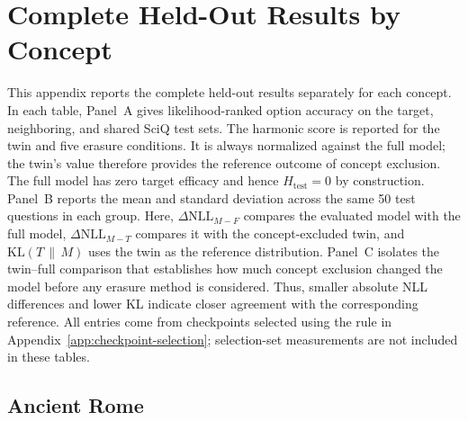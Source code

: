 \clearpage
\onecolumn
\section{Complete Held-Out Results by Concept}
\label{app:full-results}

This appendix reports the complete held-out results separately for each
concept. In each table, Panel~A gives likelihood-ranked option accuracy on the
target, neighboring, and shared SciQ test sets. The harmonic score is reported
for the twin and five erasure conditions. It is always normalized against the
full model; the twin's value therefore provides the reference outcome of
concept exclusion. The full model has zero target efficacy and hence
$H_{\mathrm{test}}=0$ by construction. Panel~B reports the mean and standard deviation
across the same 50 test questions in each group. Here,
$\Delta\mathrm{NLL}_{M-F}$ compares the evaluated model with the full model,
$\Delta\mathrm{NLL}_{M-T}$ compares it with the concept-excluded twin, and
$\mathrm{KL}(T\,\|\,M)$ uses the twin as the reference distribution. Panel~C
isolates the twin--full comparison that establishes how much concept exclusion
changed the model before any erasure method is considered. Thus, smaller
absolute NLL differences and lower KL indicate closer agreement with the
corresponding reference. All entries come from checkpoints selected using the
rule in Appendix~\ref{app:checkpoint-selection}; selection-set measurements are not
included in these tables.

\subsection{Ancient Rome}

